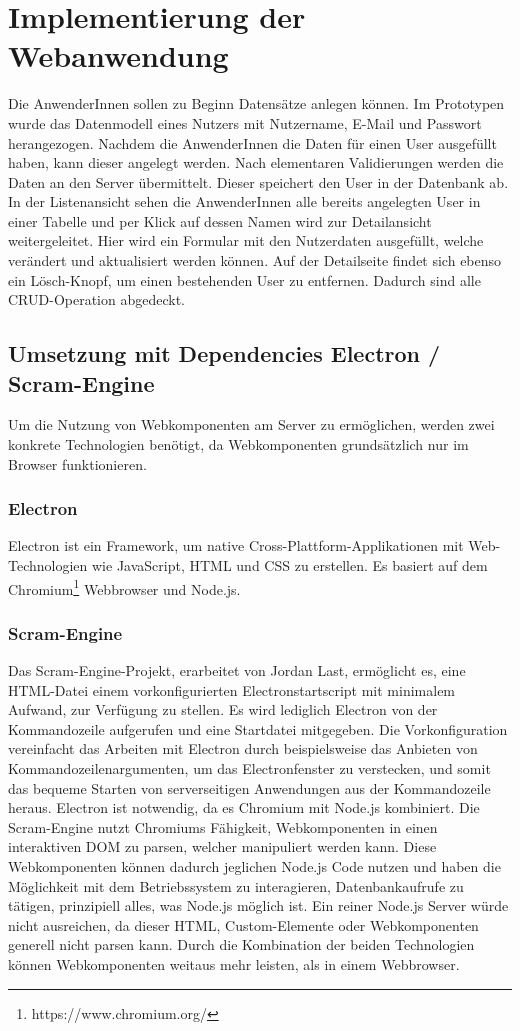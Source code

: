 \chapter{Implementierung der Webanwendung}

Die AnwenderInnen sollen zu Beginn Datensätze anlegen können. Im Prototypen wurde das Datenmodell eines Nutzers mit Nutzername, E-Mail und Passwort herangezogen.
Nachdem die AnwenderInnen die Daten für einen User ausgefüllt haben, kann dieser angelegt werden. Nach elementaren Validierungen werden die Daten an den Server übermittelt. Dieser speichert den User in der Datenbank ab. 
In der Listenansicht sehen die AnwenderInnen alle bereits angelegten User in einer Tabelle und per Klick auf dessen Namen wird zur Detailansicht weitergeleitet. Hier wird ein Formular mit den Nutzerdaten ausgefüllt, welche verändert und aktualisiert werden können.   
Auf der Detailseite findet sich ebenso ein Lösch-Knopf, um einen bestehenden User zu entfernen. Dadurch sind alle CRUD-Operation abgedeckt.
\section{Umsetzung mit Dependencies Electron / Scram-Engine}
Um die Nutzung von Webkomponenten am Server zu ermöglichen, werden zwei konkrete Technologien benötigt, da Webkomponenten grundsätzlich nur im Browser funktionieren.
\subsection{Electron}
Electron ist ein Framework, um native Cross-Plattform-Applikationen mit Web-Technologien wie JavaScript, HTML und CSS zu erstellen. Es basiert auf dem Chromium\footnote{https://www.chromium.org/} Webbrowser und Node.js.
\subsection{Scram-Engine}
\label{cha:scram-engine}
Das Scram-Engine-Projekt, erarbeitet von Jordan Last, ermöglicht es, eine HTML-Datei einem vorkonfigurierten Electronstartscript mit minimalem Aufwand, zur Verfügung zu stellen. Es wird lediglich Electron von der Kommandozeile aufgerufen und eine Startdatei mitgegeben. Die Vorkonfiguration vereinfacht das Arbeiten mit Electron durch beispielsweise das Anbieten von Kommandozeilenargumenten, um das Electronfenster zu verstecken, und somit das bequeme Starten von serverseitigen Anwendungen aus der Kommandozeile heraus.
Electron ist notwendig, da es Chromium mit Node.js kombiniert. Die Scram-Engine nutzt Chromiums Fähigkeit, Webkomponenten in einen interaktiven DOM zu parsen, welcher manipuliert werden kann. Diese Webkomponenten können dadurch jeglichen Node.js Code nutzen und haben die Möglichkeit mit dem Betriebssystem zu interagieren, Datenbankaufrufe zu tätigen, prinzipiell alles, was Node.js möglich ist.
Ein reiner Node.js Server würde nicht ausreichen, da dieser HTML, Custom-Elemente oder Webkomponenten generell nicht parsen kann.
Durch die Kombination der beiden Technologien können Webkomponenten weitaus mehr leisten, als in einem Webbrowser.

